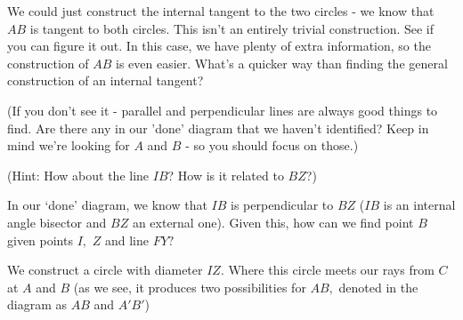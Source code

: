 
We could just construct the internal tangent to the two circles - we know that $AB$ is tangent to both circles. This isn't an entirely trivial construction. See if you can figure it out. In this case, we have plenty of extra information, so the construction of $AB$ is even easier. What's a quicker way than finding the general construction of an internal tangent?

(If you don't see it - parallel and perpendicular lines are always good things to find. Are there any in our 'done' diagram that we haven't identified?  Keep in mind we're looking for $A$ and $B$ - so you should focus on those.)

(Hint: How about the line $IB$? How is it related to $BZ$?)





In our `done' diagram, we know that $IB$ is perpendicular to $BZ$ ($IB$ is an internal angle bisector and $BZ$ an external one). Given this, how can we find point $B$ given points $I,$ $Z$ and line $FY?$


We construct a circle with diameter $IZ.$ Where this circle meets our rays from $C$ at $A$ and $B$ (as we see, it produces two possibilities for $AB,$ denoted in the diagram as $AB$ and $A'B'$)




